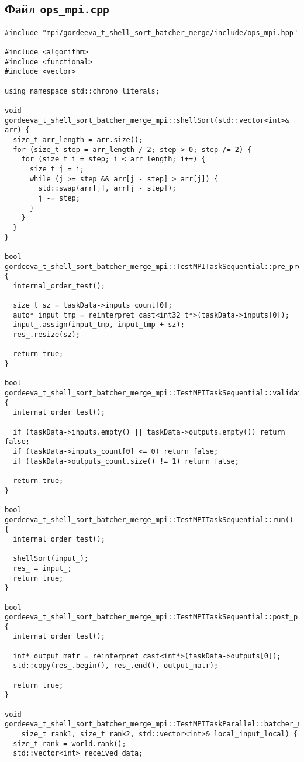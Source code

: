 \documentclass[a4paper,12pt]{article}
\begin{document}
\subsection{Файл \texttt{ops\_mpi.cpp}}
\begin{verbatim}
#include "mpi/gordeeva_t_shell_sort_batcher_merge/include/ops_mpi.hpp"

#include <algorithm>
#include <functional>
#include <vector>

using namespace std::chrono_literals;

void gordeeva_t_shell_sort_batcher_merge_mpi::shellSort(std::vector<int>& arr) {
  size_t arr_length = arr.size();
  for (size_t step = arr_length / 2; step > 0; step /= 2) {
    for (size_t i = step; i < arr_length; i++) {
      size_t j = i;
      while (j >= step && arr[j - step] > arr[j]) {
        std::swap(arr[j], arr[j - step]);
        j -= step;
      }
    }
  }
}

bool gordeeva_t_shell_sort_batcher_merge_mpi::TestMPITaskSequential::pre_processing() {
  internal_order_test();

  size_t sz = taskData->inputs_count[0];
  auto* input_tmp = reinterpret_cast<int32_t*>(taskData->inputs[0]);
  input_.assign(input_tmp, input_tmp + sz);
  res_.resize(sz);

  return true;
}

bool gordeeva_t_shell_sort_batcher_merge_mpi::TestMPITaskSequential::validation() {
  internal_order_test();

  if (taskData->inputs.empty() || taskData->outputs.empty()) return false;
  if (taskData->inputs_count[0] <= 0) return false;
  if (taskData->outputs_count.size() != 1) return false;

  return true;
}

bool gordeeva_t_shell_sort_batcher_merge_mpi::TestMPITaskSequential::run() {
  internal_order_test();

  shellSort(input_);
  res_ = input_;
  return true;
}

bool gordeeva_t_shell_sort_batcher_merge_mpi::TestMPITaskSequential::post_processing() {
  internal_order_test();

  int* output_matr = reinterpret_cast<int*>(taskData->outputs[0]);
  std::copy(res_.begin(), res_.end(), output_matr);

  return true;
}

void gordeeva_t_shell_sort_batcher_merge_mpi::TestMPITaskParallel::batcher_merge(
    size_t rank1, size_t rank2, std::vector<int>& local_input_local) {
  size_t rank = world.rank();
  std::vector<int> received_data;


\end{verbatim}
\end{document}
